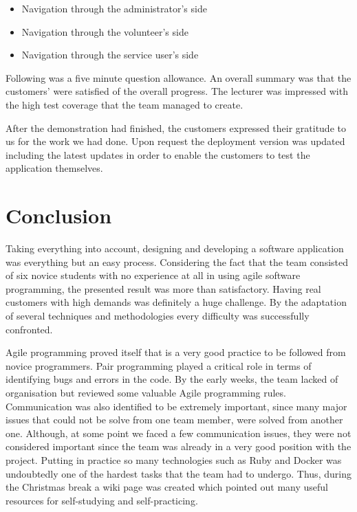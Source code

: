 \documentclass{l3proj}
\begin{document}
\begin{itemize}
	\item Navigation through the administrator's side
	\item Navigation through the volunteer's side
	\item Navigation through the service user's side
\end{itemize}

Following was a five minute question allowance. An overall summary was that the customers' were satisfied of the overall progress. The lecturer was impressed with the high test coverage that the team managed to create.

After the demonstration had finished, the customers expressed their gratitude to us for the work we had done. Upon request the deployment version was updated including the latest updates in order to enable the customers to test the application themselves.




\section{Conclusion}

Taking everything into account, designing and developing a software application was everything but an easy process. Considering the fact that the team consisted of six novice students with no experience at all in using agile software programming, the presented result was more than satisfactory. Having real customers with high demands was definitely a huge challenge. By the adaptation of several techniques and methodologies every difficulty was successfully confronted.

Agile programming proved itself that is a very good practice to be followed from novice programmers. Pair programming played a critical role in terms of identifying bugs and errors in the code. By the early weeks, the team lacked of organisation but reviewed some valuable Agile programming rules. Communication was also identified to be extremely important, since many major issues that could not be solve from one team member, were solved from another one. Although, at some point we faced a few communication issues, they were not considered important since the team was already in a very good position with the project. Putting in practice so many technologies such as Ruby and Docker was undoubtedly one of the hardest tasks that the team had to undergo. Thus, during the Christmas break a wiki page was created which pointed out many useful resources for self-studying and self-practicing.
\end{document}
